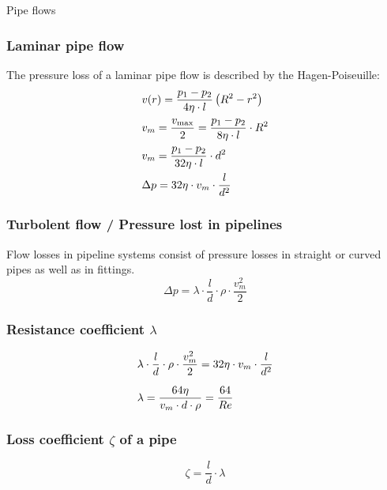 \documentclass{article}
\begin{document}
\begin{multicols}{2}
\begin{theorybox}{Pipe flows}
    \subsubsection{Laminar pipe flow}
    The pressure loss of a laminar pipe flow is described by the Hagen-Poiseuille:
    \vspace*{-0.1cm}
    \begin{align}
        &v(r) = \frac{p_1 - p_2}{4\eta \cdot l}\left(R^2 - r^2\right)\\
        &v_m = \frac{v_{\rm max}}{2} = \frac{p_1 - p_2}{8\eta \cdot l}\cdot R^2 \notag \\
        &v_m = \frac{p_1 - p_2}{32\eta \cdot l}\cdot d^2 \notag \\
        &\Delta p = 32\eta \cdot v_m\cdot \frac{l}{d^2}
    \end{align}

    \vspace*{-0.1cm}
    \subsubsection{Turbolent flow / Pressure lost in pipelines}
    Flow losses in pipeline systems consist of pressure losses in straight
    or curved pipes as well as in fittings.
    \begin{equation}
        \Delta p = \lambda \cdot \frac{l}{d} \cdot \rho \cdot \frac{v_m^2}{2}
    \end{equation}
    \subsubsection{Resistance coefficient $\lambda$}
    \vspace*{-0.5cm}
    \begin{align}
        &\lambda \cdot \frac{l}{d} \cdot \rho \cdot \frac{v_m^2}{2} = 32\eta \cdot v_m \cdot \frac{l}{d^2} \notag \\[1.5ex]
        &\lambda = \frac{64\eta}{v_m \cdot d \cdot \rho} = \frac{64}{Re}
    \end{align}

    \subsubsection{Loss coefficient $\zeta$ of a pipe}
    \begin{equation}
        \zeta = \frac{l}{d}\cdot \lambda
    \end{equation}


\end{theorybox}
\end{multicols}
\end{document}
